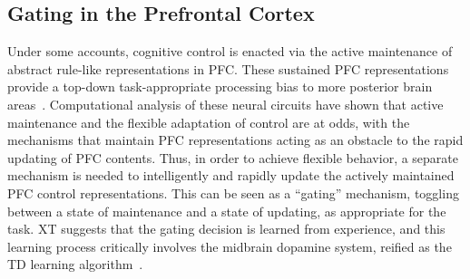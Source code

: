 \subsection{Gating in the Prefrontal Cortex} 

Under some accounts, cognitive control is enacted via the active maintenance of abstract rule-like representations in PFC.  These sustained PFC representations provide a top-down task-appropriate processing bias to more posterior brain areas~\cite{CohenJD:1990:Stroop}.  Computational analysis of these neural circuits have shown that active maintenance and the flexible adaptation of control are at odds, with the mechanisms that maintain PFC representations acting as an obstacle to the rapid updating of PFC contents. Thus, in order to achieve flexible behavior, a separate mechanism is needed to intelligently and rapidly update the actively maintained PFC control representations.  This can be seen as a ``gating'' mechanism, toggling between a state of maintenance and a state of updating, as appropriate for the task.  XT suggests that the gating decision is learned from experience, and this learning process critically involves the midbrain dopamine system, reified as the TD learning algorithm~\cite{BraverTS:2000:Control,RougierNP:2005:XT,BartoAG:1994:TDLearning}.


